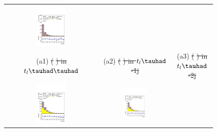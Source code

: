 \documentclass[PAPER, coverpage, atlasdraft=true, texlive=2016, UKenglish]{\ATLASLATEXPATH atlasdoc}
\providecommand{\DIFdel}[1]{{\protect\color{red}\sout{#1}}}                      %
\providecommand{\DIFdelFL}[1]{\DIFdel{#1}} %
\providecommand{\DIFaddbeginFL}{} %
\providecommand{\DIFaddendFL}{} %
\providecommand{\DIFdelbeginFL}{} %
\providecommand{\DIFdelendFL}{} %
\begin{document}
\begin{figure}[H]
\begin{tabular}{@{}ccc@{}}
\DIFdelbeginFL %
\DIFdelendFL \DIFaddbeginFL \includegraphics[page=1,width=0.33\textwidth]{figures/new_pt/reg1l1tau1b2j_ss.pdf}\DIFaddendFL \\
(a1) \DIFdelbeginFL %
\DIFdelFL{(}%
\DIFdelFL{) in $t_l\thadhad$ }\DIFdelendFL & (a2) \DIFdelbeginFL %
\DIFdelFL{(}%
\DIFdelFL{) in  $t_l\tauhad$-1j}\DIFdelendFL & (a3) \DIFdelbeginFL %
\DIFdelFL{(}%
\DIFdelFL{) in $t_l\tauhad$-2j}\DIFdelendFL \\
\DIFdelbeginFL %
\DIFdelendFL %
\DIFaddbeginFL \includegraphics[page=1,width=0.33\textwidth]{figures/new_pt/reg1l1tau1b2j_os.pdf}\DIFaddendFL &
\DIFdelbeginFL %
\DIFdelendFL \DIFaddbeginFL \includegraphics[page=1,width=0.33\textwidth]{figures/new_pt/reg1l1tau1b3j_os.pdf}\DIFaddendFL &

\end{tabular}
\end{figure}
\end{document}

